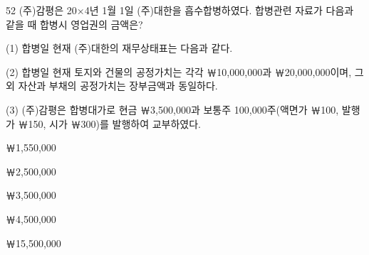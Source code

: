 \begin{question}{52}
(주)감평은 20×4년 1월 1일 (주)대한을 흡수합병하였다. 합병관련 자료가 다음과 같을 때 합병시 영업권의 금액은?
\begin{framedtext}
(1) 합병일 현재 (주)대한의 재무상태표는 다음과 같다. \par
{\centering{}\par}
(2) 합병일 현재 토지와 건물의 공정가치는 각각 ￦10,000,000과 ￦20,000,000이며, 그 외 자산과 부채의 공정가치는 장부금액과 동일하다. \par
(3) (주)감평은 합병대가로 현금 ￦3,500,000과 보통주 100,000주(액면가 ￦100, 발행가 ￦150, 시가 ￦300)를 발행하여 교부하였다.
\end{framedtext}
\begin{choices}
  \item ￦1,550,000
  \item ￦2,500,000
  \item ￦3,500,000
  \item ￦4,500,000
  \item ￦15,500,000
\end{choices}
\end{question}
